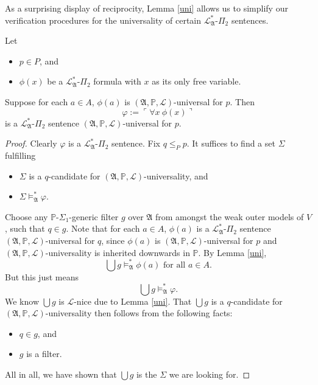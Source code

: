 \documentclass[12pt]{article}
\numberwithin{equation}{section}
\begin{document}
As a surprising display of reciprocity, Lemma \ref{uni} allows us to simplify our verification procedures for the universality of certain $\mathcal{L}^{*}_{\mathfrak{A}}$-$\Pi_2$ sentences.

\begin{lem}\label{univer}
Let 
\begin{itemize}
    \item $p \in P$, and
    \item $\phi(x)$ be a $\mathcal{L}^{*}_{\mathfrak{A}}$-$\Pi_2$ formula with $x$ as its only free variable. 
\end{itemize}
Suppose for each $a \in A$, $\phi(a)$ is $(\mathfrak{A}, \mathbb{P}, \mathcal{L})$-universal for $p$. Then
\begin{equation*}
    \varphi := \ulcorner \forall x \ \phi(x) \urcorner
\end{equation*}
is a $\mathcal{L}^{*}_{\mathfrak{A}}$-$\Pi_2$ sentence $(\mathfrak{A}, \mathbb{P}, \mathcal{L})$-universal for $p$.
\end{lem}
\begin{proof}
Clearly $\varphi$ is a $\mathcal{L}^{*}_{\mathfrak{A}}$-$\Pi_2$ sentence. Fix $q \leq_P p$. It suffices to find a set $\Sigma$ fulfilling
\begin{itemize}
    \item $\Sigma$ is a $q$-candidate for $(\mathfrak{A}, \mathbb{P}, \mathcal{L})$-universality, and 
    \item $\Sigma \models^{*}_{\mathfrak{A}} \varphi$.
\end{itemize}

Choose any $\mathbb{P}$-$\Sigma_1$-generic filter $g$ over $\mathfrak{A}$ from amongst the weak outer models of $V$, such that $q \in g$. Note that for each $a \in A$, $\phi(a)$ is a $\mathcal{L}^{*}_{\mathfrak{A}}$-$\Pi_2$ sentence $(\mathfrak{A}, \mathbb{P}, \mathcal{L})$-universal for $q$, since $\phi(a)$ is $(\mathfrak{A}, \mathbb{P}, \mathcal{L})$-universal for $p$ and $(\mathfrak{A}, \mathbb{P}, \mathcal{L})$-universality is inherited downwards in $\mathbb{P}$. By Lemma \ref{uni},
\begin{equation*}
    \bigcup g \models^{*}_{\mathfrak{A}} \phi(a) \text{ for all } a \in A \text{.}
\end{equation*}
But this just means 
\begin{equation*}
    \bigcup g \models^{*}_{\mathfrak{A}} \varphi \text{.}
\end{equation*}
We know $\bigcup g$ is $\mathcal{L}$-nice due to Lemma \ref{uni}. That $\bigcup g$ is a $q$-candidate for $(\mathfrak{A}, \mathbb{P}, \mathcal{L})$-universality then follows from the following facts:
\begin{itemize}
    \item $q \in g$, and
    \item $g$ is a filter.
\end{itemize}
All in all, we have shown that $\bigcup g$ is the $\Sigma$ we are looking for.
\end{proof}
\end{document}
